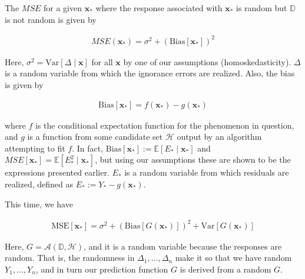 \documentclass[12pt]{article}
\begin{document}
\begin{enumerate}

The $MSE$ for a given $\bm{x}_*$ where the response associated with
$\bm{x}_*$ is random but $\mathbb{D}$ is not random is given by

\begin{align*}
	MSE(\bm{x}_*) = \sigma^2 + (\text{Bias}[\bm{x}_*])^2
\end{align*}

Here, $\sigma^2 = \text{Var}[\Delta \mid \bm{x}]$ for all $\bm{x}$ by one of our
assumptions (homoskedasticity). $\Delta$ is a random variable from which the ignorance
errors are realized. Also, the bias is given by

\begin{align*}
	\text{Bias}[\bm{x}_*] = f(\bm{x}_*) - g(\bm{x}_*)
\end{align*}

where $f$ is the conditional expectation function for the phenomenon in question,
and $g$ is a function from some candidate set $\mathcal{H}$ output by an algorithm
attempting to fit $f$. In fact, $\text{Bias}[\bm{x}_*] := \mathbb{E}[E_* \mid \bm{x}_*]$
and $MSE[\bm{x}_*] = \mathbb{E}[E_*^2 \mid \bm{x}_*]$, but using our assumptions
these are shown to be the expressions presented earlier. $E_*$ is a random variable
from which residuals are realized, defined as $E_* := Y_* - g(\bm{x}_*)$.


This time, we have

\begin{align*}
	\text{MSE}[\bm{x}_*] = \sigma^2 + (\text{Bias}[G(\bm{x}_*)])^2 + \text{Var}[G(\bm{x}_*)]
\end{align*}

Here, $G=\mathcal{A}(\mathbb{D}, \mathcal{H})$, and it is a random variable
because the responses are random. That is, the randomness in $\Delta_1,\ldots,\Delta_n$
make it so that we have random $Y_1,\ldots,Y_n$, and in turn our prediction function $G$
is derived from a random $G$.



\end{enumerate}
\end{document}
